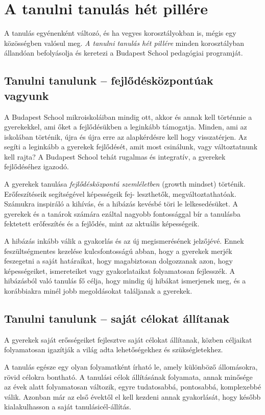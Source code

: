 \section{A tanulni tanulás hét pillére}
A tanulás egyénenként változó, és ha vegyes korosztályokban is, mégis egy közösségben valósul meg. \emph{A tanulni tanulás hét pillére} minden korosztályban állandóan befolyásolja és keretezi a Budapest School pedagógiai programját.

\subsection*{Tanulni tanulunk -- fejlődésközpontúak vagyunk}
A Budapest School mikroiskoláiban mindig ott, akkor és annak kell történnie a gyerekekkel, ami őket a fejlődésükben a leginkább támogatja. Minden, ami az iskolában történik, újra és újra erre az alapkérdésre kell hogy visszatérjen. Az segíti a leginkább a gyerekek fejlődését, amit most csinálunk, vagy változtatnunk kell rajta? A Budapest School tehát rugalmas és integratív, a gyerekek fejlődéséhez igazodó.

A gyerekek tanulása \emph{fejlődésközpontú szemléletben}
\citep{growthmindset}\linebreak
(growth mindset) történik.  Erőfeszítéseik segítségével képességeik
fej-\linebreak
leszthetők, megváltoztathatóak. Számukra inspiráló a kihívás, és a hibázás kevésbé töri le lelkesedésüket. A gyerekek és a tanárok számára ezáltal nagyobb fontossággal bír a tanulásba fektetett erőfeszítés és a fejlődés, mint az aktuális képességeik.

A hibázás inkább válik a gyakorlás és az új megismerésének jelzőjévé. Ennek feszültségmentes kezelése kulcsfontosságú abban, hogy a gyerekek merjék feszegetni a saját határaikat, hogy magabiztosan dolgozzanak azon, hogy képességeiket, ismereteiket vagy gyakorlataikat folyamatosan fejlesszék. A hibázásból való tanulás fő célja, hogy mindig új hibákat ismerjenek meg, és a korábbiakra minél jobb megoldásokat találjanak a gyerekek.

\subsection{Tanulni tanulunk -- saját célokat állítanak}
A gyerekek saját erősségeiket fejlesztve saját célokat állítanak, közben céljaikat folyamatosan igazítják a világ adta lehetőségekhez és szükségletekhez.

A tanulás egésze egy olyan folyamatként írható le, amely különböző állomásokra, rövid célokra bontható. A tanulási célok állításának folyamata, annak minősége az évek alatt folyamatosan változik, egyre tudatosabbá, pontosabbá, komplexebbé válik. Azonban már az első évektől el kell kezdeni annak gyakorlását, hogy később kialakulhasson a saját tanulásicél-állítás.

